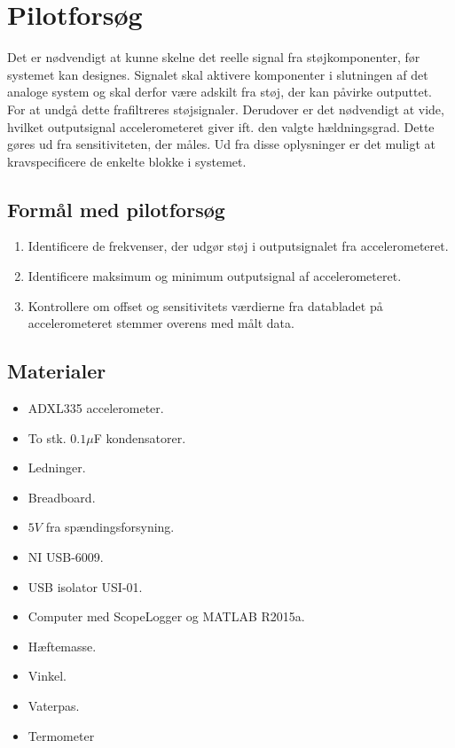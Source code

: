 \section{Pilotforsøg}\label{Sec:Pilotforsoeg}
Det er nødvendigt at kunne skelne det reelle signal fra støjkomponenter, før systemet kan designes. Signalet skal aktivere komponenter i slutningen af det analoge system og skal derfor være adskilt fra støj, der kan påvirke outputtet. For at undgå dette frafiltreres støjsignaler. Derudover er det nødvendigt at vide, hvilket outputsignal accelerometeret giver ift. den valgte hældningsgrad. Dette gøres ud fra sensitiviteten, der måles. Ud fra disse oplysninger er det muligt at kravspecificere de enkelte blokke i systemet.%

\subsection{Formål med pilotforsøg}
\begin{enumerate}
\item Identificere de frekvenser, der udgør støj i outputsignalet fra accelerometeret.
\item Identificere maksimum og minimum outputsignal af accelerometeret.
\item Kontrollere om offset og sensitivitets værdierne fra databladet på accelerometeret stemmer overens med målt data.
\end{enumerate}

\subsection{Materialer}
\begin{itemize}
\item ADXL335 accelerometer.
\item To stk. $0.1\mu$F kondensatorer.
\item Ledninger.
\item Breadboard.
\item $5V$ fra spændingsforsyning.
\item NI USB-6009.
\item USB isolator USI-01.
\item Computer med ScopeLogger og MATLAB R2015a.
\item Hæftemasse.
\item Vinkel.
\item Vaterpas.
\item Termometer
\end{itemize}


